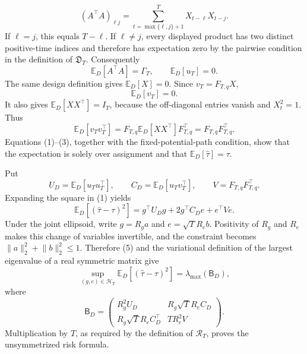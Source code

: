 \[
(A^{\top}A)_{\ell j}
=\sum_{t=\max\{\ell,j\}+1}^{T}X_{t-\ell}X_{t-j}.
\]
If \(\ell=j\), this equals \(T-\ell\).  If \(\ell\ne j\), every displayed product has two distinct positive-time indices and therefore has expectation zero by the pairwise condition in the definition of \(\mathfrak D_T\).  Consequently
\[
\mathbb E_D[A^{\top}A]=\Gamma_T,
\qquad
\mathbb E_D[u_T]=0.
\tag{2}
\]
The same design definition gives \(\mathbb E_D[X]=0\).  Since \(v_T=F_{T,q}X\),
\[
\mathbb E_D[v_T]=0.
\tag{3}
\]
It also gives \(\mathbb E_D[XX^{\top}]=I_T\), because the off-diagonal entries vanish and \(X_t^2=1\).  Thus
\[
\mathbb E_D[v_Tv_T^{\top}]
=F_{T,q}\mathbb E_D[XX^{\top}]F_{T,q}^{\top}
=F_{T,q}F_{T,q}^{\top}.
\tag{4}
\]
Equations (1)--(3), together with the fixed-potential-path condition, show that the expectation is solely over assignment and that \(\mathbb E_D[\widehat\tau]=\tau\).

Put
\[
U_D=\mathbb E_D[u_Tu_T^{\top}],
\qquad
C_D=\mathbb E_D[u_Tv_T^{\top}],
\qquad
V=F_{T,q}F_{T,q}^{\top}.
\]
Expanding the square in (1) yields
\[
\mathbb E_D[(\widehat\tau-\tau)^2]
=g^{\top}U_Dg+2g^{\top}C_De+e^{\top}Ve.
\tag{5}
\]
Under the joint ellipsoid, write \(g=R_ga\) and \(e=\sqrt T R_eb\).  Positivity of \(R_g\) and \(R_e\) makes this change of variables invertible, and the constraint becomes \(\lVert a\rVert_2^2+\lVert b\rVert_2^2\le1\).  Therefore (5) and the variational definition of the largest eigenvalue of a real symmetric matrix give
\[
\sup_{(g,e)\in\mathcal H_T}\mathbb E_D[(\widehat\tau-\tau)^2]
=\lambda_{\max}(\mathsf B_D),
\]
where
\[
\mathsf B_D=
\begin{pmatrix}
R_g^2U_D&R_g\sqrt T R_e C_D\\
R_g\sqrt T R_e C_D^{\top}&T R_e^2V
\end{pmatrix}.
\tag{6}
\]
Multiplication by \(T\), as required by the definition of \(\mathcal R_T\), proves the unsymmetrized risk formula.

